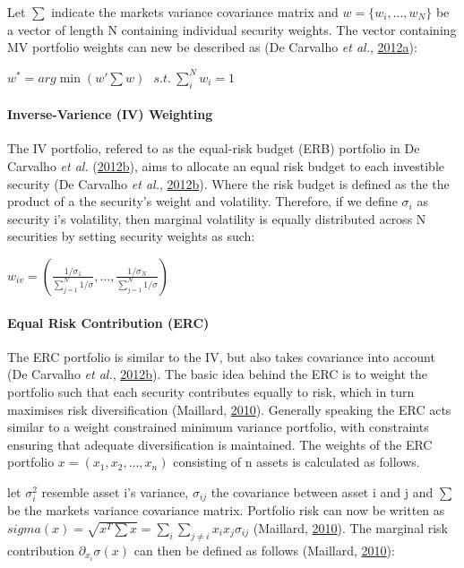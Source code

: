 \documentclass[11pt,preprint, authoryear]{elsarticle}
\numberwithin{equation}{section}
\numberwithin{figure}{section}
\numberwithin{table}{section}
\begin{document}
Let \(\sum\) indicate the markets variance covariance matrix and
\(w=\{w_i,..., w_N \}\) be a vector of length N containing individual
security weights. The vector containing MV portfolio weights can new be
described as (De Carvalho \emph{et al.},
\protect\hyperlink{ref-rawl2012}{2012}\protect\hyperlink{ref-rawl2012}{a}):

\(w^*=arg\min(w'\sum w)\ \ \ s.t.\ \sum^N_iw_i=1\)

\hypertarget{inverse-varience-iv-weighting}{%
\paragraph{Inverse-Varience (IV)
Weighting}\label{inverse-varience-iv-weighting}}

The IV portfolio, refered to as the equal-risk budget (ERB) portfolio in
De Carvalho \emph{et al.}
(\protect\hyperlink{ref-leote}{2012}\protect\hyperlink{ref-leote}{b}),
aims to allocate an equal risk budget to each investible security (De
Carvalho \emph{et al.},
\protect\hyperlink{ref-leote}{2012}\protect\hyperlink{ref-leote}{b}).
Where the risk budget is defined as the the product of a the security's
weight and volatility. Therefore, if we define \(\sigma_i\) as security
i's volatility, then marginal volatility is equally distributed across N
securities by setting security weights as such:

\(w_{iv}=(\frac{1/\sigma_1}{\sum^N_{j=1} 1/\sigma}, ...,\frac{1/\sigma_N}{\sum^N_{j=1} 1/\sigma} )\)

\hypertarget{equal-risk-contribution-erc}{%
\paragraph{Equal Risk Contribution
(ERC)}\label{equal-risk-contribution-erc}}

The ERC portfolio is similar to the IV, but also takes covariance into
account (De Carvalho \emph{et al.},
\protect\hyperlink{ref-leote}{2012}\protect\hyperlink{ref-leote}{b}).
The basic idea behind the ERC is to weight the portfolio such that each
security contributes equally to risk, which in turn maximises risk
diversification (Maillard, \protect\hyperlink{ref-maillard2010}{2010}).
Generally speaking the ERC acts similar to a weight constrained minimum
variance portfolio, with constraints ensuring that adequate
diversification is maintained. The weights of the ERC portfolio
\(x=(x_1,x_2,...,x_n)\) consisting of n assets is calculated as follows.

let \(\sigma_i^2\) resemble asset i's variance, \(\sigma_{ij}\) the
covariance between asset i and j and \(\sum\) be the markets variance
covariance matrix. Portfolio risk can now be written as
\(sigma(x)=\sqrt{x^T\sum x}=\sum_i\sum_{j\neq i}x_ix_j\sigma_{ij}\)
(Maillard, \protect\hyperlink{ref-maillard2010}{2010}). The marginal
risk contribution \(\partial_{x_i}\sigma(x)\) can then be defined as
follows (Maillard, \protect\hyperlink{ref-maillard2010}{2010}):
\end{document}
